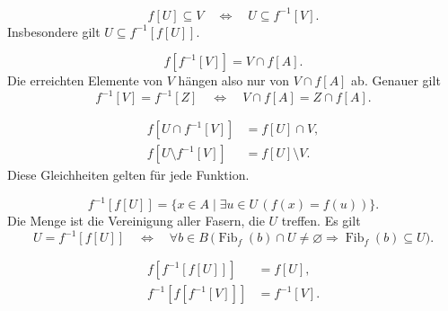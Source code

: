 \begin{theorem}
\label{b05guide:thm:adjunction}
\[
 f[U]\subseteq V\quad\Longleftrightarrow\quad U\subseteq f^{-1}[V].
\]
Insbesondere gilt $U\subseteq f^{-1}[f[U]]$.
\end{theorem}

\begin{theorem}
\label{b05guide:thm:imagepreimage}
\[
 f[f^{-1}[V]]=V\cap f[A].
\]
Die erreichten Elemente von $V$ hängen also nur von
$V\cap f[A]$ ab. Genauer gilt
\[
 f^{-1}[V]=f^{-1}[Z]
 \quad\Longleftrightarrow\quad
 V\cap f[A]=Z\cap f[A].
\]
\end{theorem}

\begin{theorem}
\label{b05guide:thm:mixed}
\[
 \begin{aligned}
 f[U\cap f^{-1}[V]]&=f[U]\cap V,\\
 f[U\setminus f^{-1}[V]]&=f[U]\setminus V.
 \end{aligned}
\]
Diese Gleichheiten gelten für jede Funktion.
\end{theorem}

\begin{theorem}
\label{b05guide:thm:preimageimage}
\[
 f^{-1}[f[U]]
   =\{x\in A\mid\exists u\in U\,(f(x)=f(u))\}.
\]
Die Menge ist die Vereinigung aller Fasern, die $U$ treffen.
Es gilt
\[
 U=f^{-1}[f[U]]
 \quad\Longleftrightarrow\quad
 \forall b\in B\,
 \bigl(\operatorname{Fib}_f(b)\cap U\ne\varnothing
       \Rightarrow\operatorname{Fib}_f(b)\subseteq U\bigr).
\]
\end{theorem}

\begin{theorem}
\label{b05guide:thm:repeated}
\[
 \begin{aligned}
 f[f^{-1}[f[U]]]&=f[U],\\
 f^{-1}[f[f^{-1}[V]]]&=f^{-1}[V].
 \end{aligned}
\]
\end{theorem}

